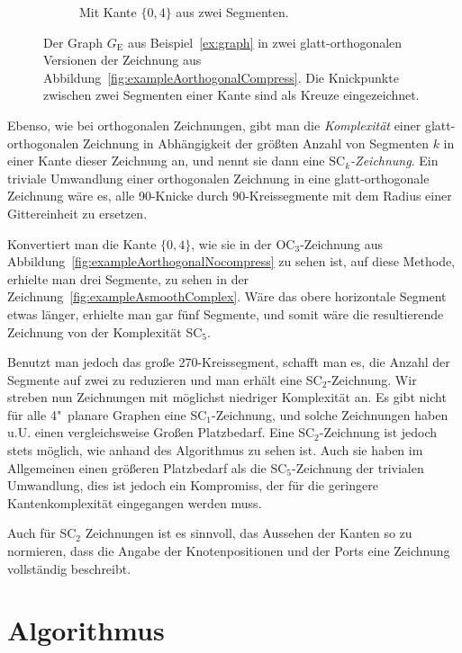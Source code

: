 \documentclass[a4paper]{scrreprt}
\theoremstyle{definition}
\begin{document}
\begin{figure}[h]
\begin{subfigure}[b]{0.6\textwidth}
  \caption{Mit Kante $\{0,4\}$ aus zwei Segmenten.}
  \label{fig:exampleAsmoothSimple}
\end{subfigure}
  \caption{Der Graph $G_\text{E}$ aus Beispiel~\ref{ex:graph} in zwei glatt-orthogonalen Versionen der Zeichnung aus Abbildung~\ref{fig:exampleAorthogonalCompress}. Die Knickpunkte zwischen zwei Segmenten einer Kante sind als Kreuze eingezeichnet.}
  \label{fig:exampleAsmooth}
\end{figure}

Ebenso, wie bei orthogonalen Zeichnungen, gibt man die \emph{Komplexität} einer glatt-orthogonalen Zeichnung in Abhängigkeit der größten Anzahl von Segmenten $k$ in einer Kante dieser Zeichnung an, und nennt sie dann eine \emph{$\text{SC}_k$-Zeichnung}. Ein triviale Umwandlung einer orthogonalen Zeichnung in eine glatt-orthogonale Zeichnung wäre es, alle 90\textdegree-Knicke durch 90\textdegree-Kreissegmente mit dem Radius einer Gittereinheit zu ersetzen.

Konvertiert man die Kante $\{0,4\}$, wie sie in der OC$_3$-Zeichnung aus Abbildung~\ref{fig:exampleAorthogonalNocompress} zu sehen ist, auf diese Methode, erhielte man drei Segmente, zu sehen in der Zeichnung~\ref{fig:exampleAsmoothComplex}. Wäre das obere horizontale Segment etwas länger, erhielte man gar fünf Segmente, und somit wäre die resultierende Zeichnung von der Komplexität SC$_5$.

Benutzt man jedoch das große 270\textdegree-Kreissegment, schafft man es, die Anzahl der Segmente auf zwei zu reduzieren und man erhält eine SC$_2$-Zeichnung. Wir streben nun Zeichnungen mit möglichst niedriger Komplexität an. Es gibt nicht für alle 4"~planare Graphen eine SC$_1$-Zeichnung, und solche Zeichnungen haben u.U. einen vergleichsweise Großen Platzbedarf. Eine SC$_2$-Zeichnung ist jedoch stets möglich, wie anhand des Algorithmus zu sehen ist. Auch sie haben im Allgemeinen einen größeren Platzbedarf als die SC$_5$-Zeichnung der trivialen Umwandlung, dies ist jedoch ein Kompromiss, der für die geringere Kantenkomplexität eingegangen werden muss. %

Auch für SC$_2$ Zeichnungen ist es sinnvoll, das Aussehen der Kanten so zu normieren, dass die Angabe der Knotenpositionen und der Ports eine Zeichnung vollständig beschreibt.




\chapter{Algorithmus}
\label{chap:algo}
\end{document}
